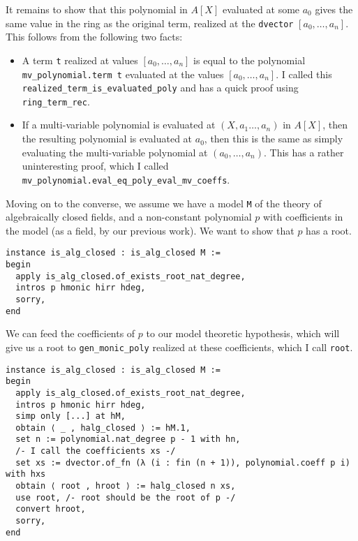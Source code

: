 It remains to show that this polynomial in $A[X]$
evaluated at some $a_{0}$ gives the same value in the ring as the original term,
realized at the \texttt{dvector} $[a_{0},\dots,a_{n}]$.
This follows from the following two facts:
\begin{itemize}
  \item A term \texttt{t} realized at values $[a_{0},\dots,a_{n}]$ is equal to
        the polynomial \texttt{mv\_polynomial.term t}
        evaluated at the values $[a_{0},\dots,a_{n}]$.
        I called this \texttt{realized\_term\_is\_evaluated\_poly}
        and has a quick proof using \texttt{ring\_term\_rec}.
  \item If a multi-variable polynomial is evaluated at $(X,a_{1}\dots,a_{n})$
        in $A[X]$, then the resulting polynomial is evaluated at $a_{0}$,
        then this is the same as simply evaluating the multi-variable polynomial
        at $(a_{0},\dots,a_{n})$.
        This has a rather uninteresting proof,
        which I called \texttt{mv\_polynomial.eval\_eq\_poly\_eval\_mv\_coeffs}.
\end{itemize}

Moving on to the converse, we assume we have a model \texttt{M} of the theory
of algebraically closed fields, and a non-constant polynomial $p$
with coefficients in the model (as a field, by our previous work).
We want to show that $p$ has a root.
\begin{lstlisting}
instance is_alg_closed : is_alg_closed M :=
begin
  apply is_alg_closed.of_exists_root_nat_degree,
  intros p hmonic hirr hdeg,
  sorry,
end\end{lstlisting}

We can feed the coefficients of $p$ to our model theoretic hypothesis,
which will give us a root to \texttt{gen\_monic\_poly}
realized at these coefficients, which I call \texttt{root}.

\begin{lstlisting}
instance is_alg_closed : is_alg_closed M :=
begin
  apply is_alg_closed.of_exists_root_nat_degree,
  intros p hmonic hirr hdeg,
  simp only [...] at hM,
  obtain ⟨ _ , halg_closed ⟩ := hM.1,
  set n := polynomial.nat_degree p - 1 with hn,
  /- I call the coefficients xs -/
  set xs := dvector.of_fn (λ (i : fin (n + 1)), polynomial.coeff p i) with hxs
  obtain ⟨ root , hroot ⟩ := halg_closed n xs,
  use root, /- root should be the root of p -/
  convert hroot,
  sorry,
end
\end{lstlisting}

